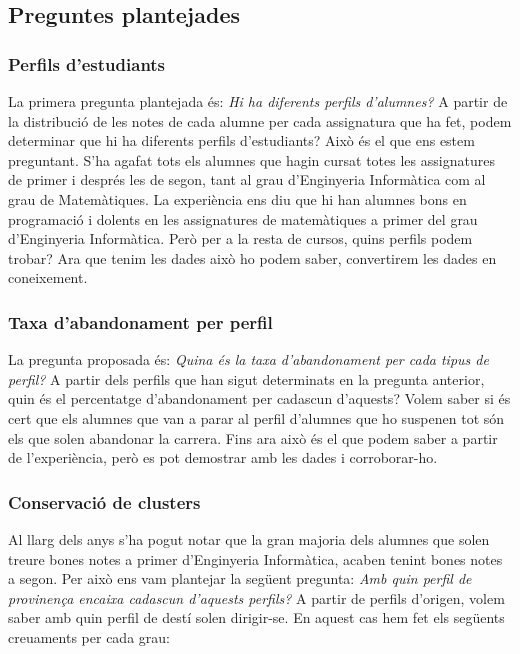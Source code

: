 \documentclass[12pt,a4paper,catalan]{article}
\begin{document}
\subsection{Preguntes plantejades}
\label{subsec:preguntesplantejades}
\subsubsection{Perfils d'estudiants}
La primera pregunta plantejada és: \textit{Hi ha diferents perfils d'alumnes?} A partir de la distribució de les notes de cada alumne per cada assignatura que ha fet, podem determinar que hi ha diferents perfils d'estudiants? Això és el que ens estem preguntant. S'ha agafat tots els alumnes que hagin cursat totes les assignatures de primer i després les de segon, tant al grau d'Enginyeria Informàtica com al grau de Matemàtiques. La experiència ens diu que hi han alumnes bons en programació i dolents en les assignatures de matemàtiques a primer del grau d'Enginyeria Informàtica. Però per a la resta de cursos, quins perfils podem trobar? Ara que tenim les dades això ho podem saber, convertirem les dades en coneixement.

\subsubsection{Taxa d'abandonament per perfil}
La pregunta proposada és: \textit{Quina és la taxa d'abandonament per cada tipus de perfil?} A partir dels perfils que han sigut determinats en la pregunta anterior, quin és el percentatge d'abandonament per cadascun d'aquests? Volem saber si és cert que els alumnes que van a parar al perfil d'alumnes que ho suspenen tot són els que solen abandonar la carrera. Fins ara això és el que podem saber a partir de l'experiència, però es pot demostrar amb les dades i corroborar-ho.

\subsubsection{Conservació de clusters}
Al llarg dels anys s'ha pogut notar que la gran majoria dels alumnes que solen treure bones notes a primer d'Enginyeria Informàtica, acaben tenint bones notes a segon. Per això ens vam plantejar la següent pregunta: \textit{Amb quin perfil de provinença encaixa cadascun d'aquests perfils?} A partir de perfils d'origen, volem saber amb quin perfil de destí solen dirigir-se. En aquest cas hem fet els següents creuaments per cada grau:
\end{document}
